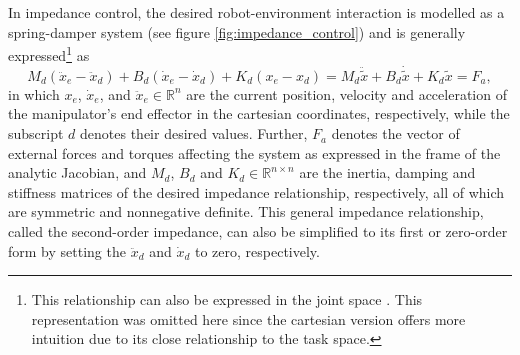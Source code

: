 In impedance control, the desired robot-environment interaction is modelled as a spring-damper system (see figure \ref{fig:impedance_control}) and is generally expressed\footnote{This relationship can also be expressed in the joint space \cite{tsetserukouISoRAHumanoidRobot2009,liImpedanceControlMultipoint2011,liModelfreeImpedanceControl2011,liLearningImpedanceControl2012}. This representation was omitted here since the cartesian version offers more intuition due to its close relationship to the task space.} as
\begin{equation} \label{eq:impedance_relationship}
  M_d \left(\ddot{ x }_e -\ddot{ x }_d \right)+ B_d \left(\dot{x}_e - \dot{x}_d \right)+ K_d \left( x_e - x_d \right) = M_d \ddot{\widetilde{ x }}+ B_d \dot{\widetilde{ x }}+ K_d \widetilde{ x }= F_a,
\end{equation}
in which $x_e$, $\dot{x}_e$, and $\ddot{ x }_e \in\mathbb{R}^n$ are the current position, velocity and acceleration of the manipulator's end effector in the cartesian coordinates, respectively, while the subscript $d$ denotes their desired values. Further, $F_a$ denotes the vector of external forces and torques affecting the system as expressed in the frame of the analytic Jacobian, and $M_d$, $B_{d}$ and $K_d \in\mathbb{R}^{ n \times n }$ are the inertia, damping and stiffness matrices of the desired impedance relationship, respectively, all of which are symmetric and nonnegative definite. This general impedance relationship, called the second-order impedance, can also be simplified to its first or zero-order form by setting the $\ddot{x}_d$ and $\dot{x}_d$ to zero, respectively.

